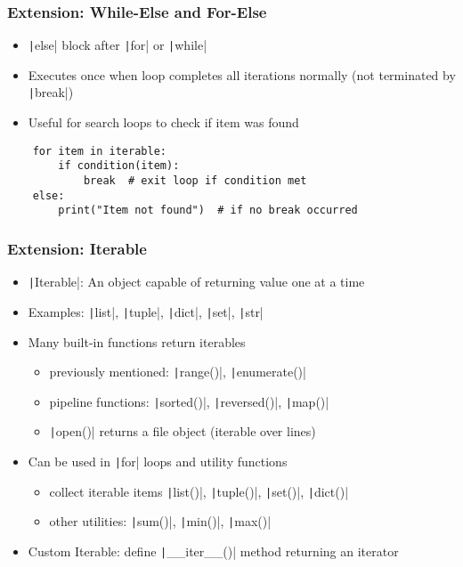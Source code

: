 \documentclass{beamer}
\begin{document}
\begin{frame}[fragile]
    \frametitle{Extension: While-Else and For-Else}
    \begin{itemize}
        \item \texttt|else| block after \texttt|for| or \texttt|while|
        \item Executes once when loop completes all iterations normally (not terminated by \texttt|break|)
        \item Useful for search loops to check if item was found
    \end{itemize}

    \begin{verbatim}
    for item in iterable:
        if condition(item):
            break  # exit loop if condition met
    else:
        print("Item not found")  # if no break occurred
    \end{verbatim}
\end{frame}


\begin{frame}[fragile]
    \frametitle{Extension: Iterable}
    \begin{itemize}
        \item \texttt|Iterable|: An object capable of returning value one at a time
        \item Examples: \texttt|list|, \texttt|tuple|, \texttt|dict|, \texttt|set|, \texttt|str|
        \item Many built-in functions return iterables
              \begin{itemize}
                  \item previously mentioned: \texttt|range()|, \texttt|enumerate()|
                  \item pipeline functions: \texttt|sorted()|, \texttt|reversed()|, \texttt|map()|
                  \item \texttt|open()| returns a file object (iterable over lines)
              \end{itemize}
        \item Can be used in \texttt|for| loops and utility functions
              \begin{itemize}
                  \item collect iterable items \texttt|list()|, \texttt|tuple()|, \texttt|set()|, \texttt|dict()|
                  \item other utilities: \texttt|sum()|, \texttt|min()|, \texttt|max()|
              \end{itemize}


        \item Custom Iterable: define \texttt|__iter__()| method returning an iterator
    \end{itemize}
\end{frame}
\end{document}
